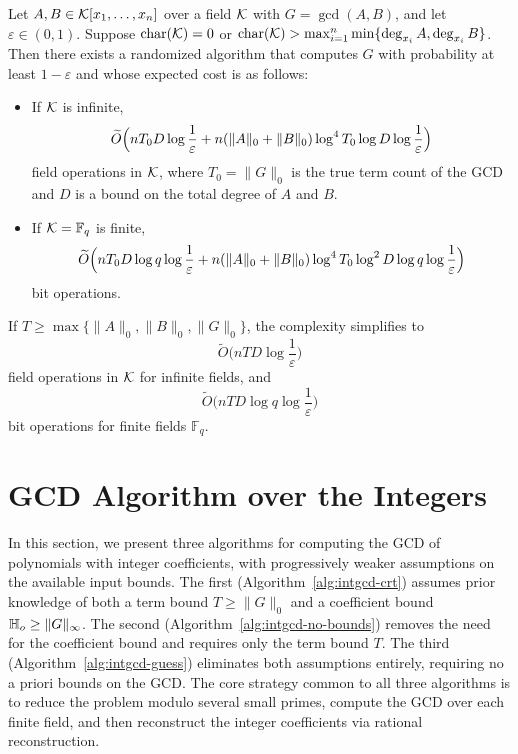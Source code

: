 \documentclass{article}
\numberwithin{equation}{section}
\begin{document}
\begin{theorem}\label{thm:gcd-no-t}
Let $A, B \in {\mathcal{K}}[x_1,\dots,x_n]$ over a field ${\mathcal{K}}$ with $G = \gcd(A,B)$, and let $\varepsilon \in (0,1)$. Suppose $\operatorname{char}({\mathcal{K}}) = 0$ or $\operatorname{char}({\mathcal{K}}) > \max_{i=1}^n\min\{\deg_{x_i} A,\deg_{x_i} B\}$. Then there exists a randomized algorithm that computes $G$ with probability at least $1-\varepsilon$ and whose expected cost is as follows:

\begin{itemize}
    \item If ${\mathcal{K}}$ is infinite,
    \[
    \widetilde{O}\Bigl(
    n T_0 D \log\frac{1}{\varepsilon}
    + n(\|A\|_0 + \|B\|_0) \log^4 T_0 \log D \log\frac{1}{\varepsilon}
    \Bigr)
    \]
    field operations in ${\mathcal{K}}$, where $T_0 = \|G\|_0$ is the true term count of the GCD and $D$ is a bound on the total degree of $A$ and $B$.

    \item If ${\mathcal{K}} = \mathbb{F}_q$ is finite,
    \[
    \widetilde{O}\Bigl(
    n T_0 D \log q \log\frac{1}{\varepsilon}
    + n(\|A\|_0 + \|B\|_0) \log^4 T_0 \log^2 D \log q \log\frac{1}{\varepsilon}
    \Bigr)
    \]
    bit operations.
\end{itemize}
\end{theorem}



\begin{remark}
If $T \ge \max\{\|A\|_0, \|B\|_0, \|G\|_0\}$, the complexity simplifies to
\[
\widetilde{O}\bigl( n T D \log\frac{1}{\varepsilon} \bigr)
\]
field operations in ${\mathcal{K}}$ for infinite fields, and
\[
\widetilde{O}\bigl( n T D \log q \log\frac{1}{\varepsilon} \bigr)
\]
bit operations for finite fields $\mathbb{F}_q$.
\end{remark}

\section{GCD Algorithm over the Integers}
\label{sec:int-gcd}

In this section, we present three algorithms for computing the GCD of polynomials with integer coefficients, with progressively weaker assumptions on the available input bounds. The first (Algorithm~\ref{alg:intgcd-crt}) assumes prior knowledge of both a term bound $T \ge \|G\|_0$ and a coefficient bound $\mathbb{H}_{o} \ge \|G\|_\infty$. The second (Algorithm~\ref{alg:intgcd-no-bounds}) removes the need for the coefficient bound and requires only the term bound $T$. The third (Algorithm~\ref{alg:intgcd-guess}) eliminates both assumptions entirely, requiring no a priori bounds on the GCD. The core strategy common to all three algorithms is to reduce the problem modulo several small primes, compute the GCD over each finite field, and then reconstruct the integer coefficients via rational reconstruction.
\end{document}
